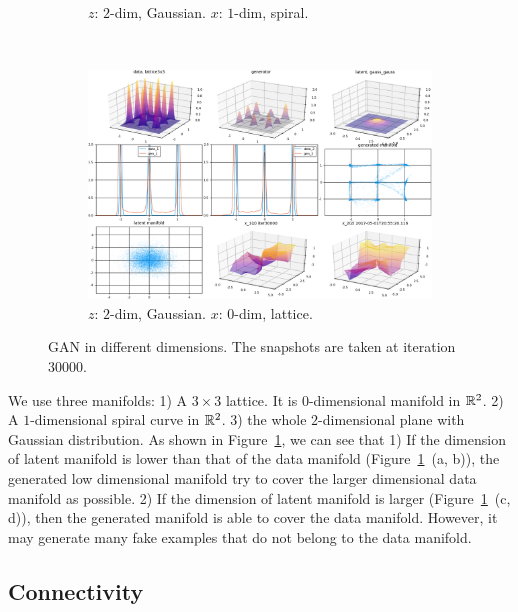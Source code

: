 \begin{figure}[ht]
\begin{subfigure}[t]{0.45\textwidth}
        \caption{$z$: $2$-dim, Gaussian.
            $x$: $1$-dim, spiral.}
    \end{subfigure}
    ~
    \begin{subfigure}[t]{0.45\textwidth}
        \includegraphics[width=\linewidth]{"fig/gaussgauss_lattice3x3_00030000"}
        \caption{$z$: $2$-dim, Gaussian.
            $x$: $0$-dim, lattice.}
    \end{subfigure}
    \caption{\small
        GAN in different dimensions.
        The snapshots are taken at iteration $30000$.
        }
    \label{fig:dim}
\end{figure}

We use three manifolds:
1) A $3\times3$ lattice. It is $0$-dimensional manifold in ${\mathbb{R}}^2$.
2) A $1$-dimensional spiral curve in ${\mathbb{R}}^2$.
3) the whole $2$-dimensional plane with Gaussian distribution.
As shown in Figure~\ref{fig:dim},
we can see that
1) If the dimension of latent manifold is lower than that of the data manifold
(Figure~\ref{fig:dim}~(a, b)),
the generated low dimensional manifold try to cover the
larger dimensional data manifold as possible.
2) If the dimension of latent manifold is larger (Figure~\ref{fig:dim}~(c, d)),
then the generated manifold is able to cover the data manifold.
However,
it may generate many fake examples that do not belong to the data manifold.

\subsection{Connectivity}

